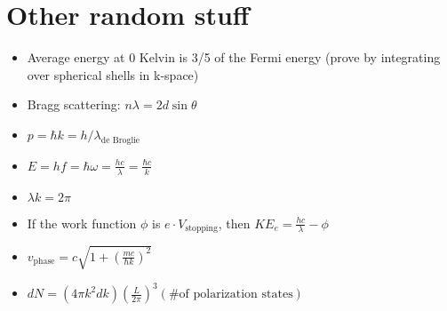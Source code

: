 \documentclass[12pt]{article}
\begin{document}
\section{Other random stuff}
\begin{itemize}
    \item Average energy at 0 Kelvin is 3/5 of the Fermi energy (prove by integrating over spherical shells in k-space)
    \item Bragg scattering: $n \lambda = 2 d \sin \theta$
    \item $p=\hbar k= h/\lambda_\text{de Broglie}$
    \item $E = h f = \hbar \omega = \frac{h c}{\lambda} = \frac{\hbar c}{k}$
    \item $\lambda k = 2 \pi$
    \item If the work function $\phi$ is $e \cdot V_\text{stopping}$, then $KE_e = \frac{hc}{\lambda} - \phi$
    \item $v_\text{phase} = c \sqrt{1 + \left( \frac{mc}{\hbar k}  \right)^2}$
    \item $dN = (4 \pi k^2 dk) \left( \frac{L}{2 \pi} \right)^3 (\text{\# of polarization states})$
\end{itemize}
\end{document}
